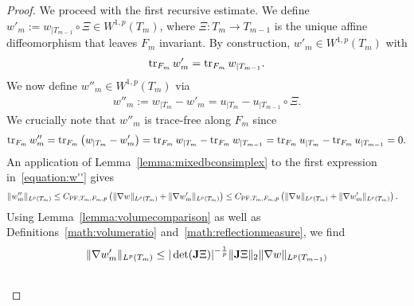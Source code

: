 \documentclass[10pt,a4paper]{article}
\begin{document}
\begin{proof}
    We proceed with the first recursive estimate. 
    We define $w'_{m} := w_{|T_{m-1}} \circ \Xi \in W^{1,p}(T_{m})$,
    where $\Xi : T_{m} \rightarrow T_{m-1}$ is the unique affine diffeomorphism that leaves $F_{m}$ invariant. 
    By construction, $w'_{m} \in W^{1,p}(T_{m})$ with 
    \begin{align*}
        \operatorname{tr}_{F_{m}} w'_{m} = \operatorname{tr}_{F_{m}} w_{|T_{m-1}}
        .
    \end{align*}
    We now define $w''_{m} \in W^{1,p}(T_{m})$ via 
    \begin{align}\label{equation:w''}
        w''_{m} 
        := 
        w_{|T_{m}} - w'_{m} = u_{|T_{m}} - u_{|T_{m-1}} \circ \Xi.
    \end{align}
    We crucially note that $w''_{m}$ is trace-free along $F_{m}$ since
    \begin{align*}
        \operatorname{tr}_{F_{m}} w''_{m} 
        = 
        \operatorname{tr}_{F_{m}} \left( 
            w_{|T_{m}} - w'_{m} 
        \right) 
        =
        \operatorname{tr}_{F_{m}} w_{|T_{m}}
        -
        \operatorname{tr}_{F_{m}} w_{|T_{m-1}}
        =
        \operatorname{tr}_{F_{m}} u_{|T_{m}}
        -
        \operatorname{tr}_{F_{m}} u_{|T_{m-1}}
        = 0.
    \end{align*}
    An application of Lemma~\ref{lemma:mixedbconsimplex} to the first expression in~\eqref{equation:w''} gives 
    \begin{align*}
        \| w''_{m} \|_{L^{p}(T_{m})} 
        &
        \leq 
        C_{{\rm PF},T_{m},F_{m},p} 
        \left( 
            \| \nabla w \|_{L^{p}(T_{m})} 
            + 
            \| \nabla w'_{m} \|_{L^{p}(T_{m})} 
        \right) 
        \leq 
        C_{{\rm PF},T_{m},F_{m},p} 
        \left( 
            \| \nabla u \|_{L^{p}(T_{m})} 
            + 
            \| \nabla w'_{m} \|_{L^{p}(T_{m})} 
        \right) 
        .
    \end{align*}
    Using Lemma~\ref{lemma:volumecomparison} as well as Definitions~\eqref{math:volumeratio} and~\eqref{math:reflectionmeasure}, we find 
    \begin{align*}
        \| \nabla w'_{m} \|_{L^{p}(T_{m})}
        &
        \leq 
        |\det(\Jacobian \Xi  )|^{-\frac 1 p} 
        \matnorm{ \Jacobian \Xi }
        \| \nabla w \|_{L^{p}(T_{m-1})}
        \\&

\end{align*}
\end{proof}
\end{document}
